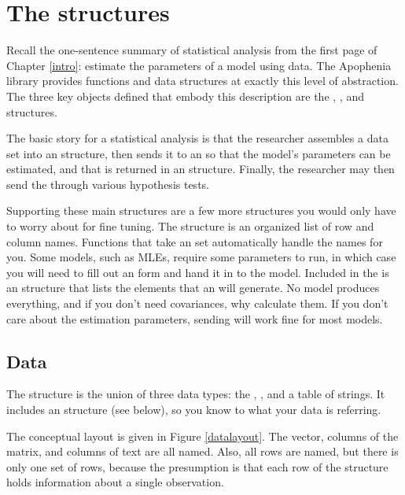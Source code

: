 \section{The structures}
Recall the one-sentence summary of statistical analysis from
the first page of Chapter \ref{intro}: estimate the parameters
of a model using data. The Apophenia library provides functions
and data structures at exactly this level of abstraction. The
three key objects defined that embody this description are the
, , and 
structures.

The basic story for a statistical analysis is that the researcher
assembles a data set into an  structure, then sends it to
an  so that the model's parameters can be estimated,
and that is returned in an  structure. Finally, the
researcher may then send the  through various
hypothesis tests.

Supporting these main structures are a few more structures you would only
have to worry about for fine tuning.  The  structure is
an organized list of row and column names. Functions that take an 
 set automatically handle the names for you. 
Some models, such as MLEs, require some parameters to run, in
which case you will need to fill out an 
form and hand it in to the model. Included in the
 is an
 structure that lists the elements
that an  will generate. No model produces
everything, and if you don't need covariances, why calculate them. If you
don't care about the estimation parameters, sending  will
work fine for most models. 

\subsection{Data} 
The  structure is the union of three data types:
the , , and a table of strings. It
includes an  structure (see below), so you know to what
your data is referring.

The conceptual layout is given in Figure \ref{datalayout}. The vector,
columns of the matrix, and columns of text are all named. Also, all rows
are named, but there is only one set of rows, because the presumption is
that each row of the structure holds information about a single
observation.

